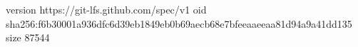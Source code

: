 version https://git-lfs.github.com/spec/v1
oid sha256:f6b30001a936dfc6d39eb1849eb0b69aecb68e7bfeeaaeeaa81d94a9a41dd135
size 87544
